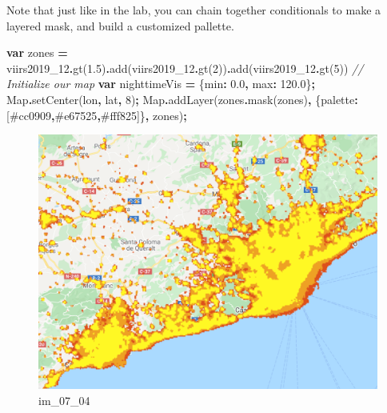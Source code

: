 \documentclass[
]{article}
\newenvironment{Shaded}{\begin{snugshade}}{\end{snugshade}}
\newcommand{\BuiltInTok}[1]{#1}
\newcommand{\CommentTok}[1]{\textcolor[rgb]{0.56,0.35,0.01}{\textit{#1}}}
\newcommand{\DataTypeTok}[1]{\textcolor[rgb]{0.13,0.29,0.53}{#1}}
\newcommand{\DecValTok}[1]{\textcolor[rgb]{0.00,0.00,0.81}{#1}}
\newcommand{\FloatTok}[1]{\textcolor[rgb]{0.00,0.00,0.81}{#1}}
\newcommand{\FunctionTok}[1]{\textcolor[rgb]{0.00,0.00,0.00}{#1}}
\newcommand{\KeywordTok}[1]{\textcolor[rgb]{0.13,0.29,0.53}{\textbf{#1}}}
\newcommand{\NormalTok}[1]{#1}
\newcommand{\OperatorTok}[1]{\textcolor[rgb]{0.81,0.36,0.00}{\textbf{#1}}}
\newcommand{\StringTok}[1]{\textcolor[rgb]{0.31,0.60,0.02}{#1}}
\begin{document}
Note that just like in the lab, you can chain together conditionals to make a layered mask, and build a customized pallette.

\begin{Shaded}
\begin{Highlighting}[]
\KeywordTok{var}\NormalTok{ zones }\OperatorTok{=}\NormalTok{ viirs2019\_12}\OperatorTok{.}\FunctionTok{gt}\NormalTok{(}\FloatTok{1.5}\NormalTok{)}\OperatorTok{.}\FunctionTok{add}\NormalTok{(viirs2019\_12}\OperatorTok{.}\FunctionTok{gt}\NormalTok{(}\DecValTok{2}\NormalTok{))}\OperatorTok{.}\FunctionTok{add}\NormalTok{(viirs2019\_12}\OperatorTok{.}\FunctionTok{gt}\NormalTok{(}\DecValTok{5}\NormalTok{))}
\CommentTok{// Initialize our map}
\KeywordTok{var}\NormalTok{ nighttimeVis }\OperatorTok{=}\NormalTok{ \{}\DataTypeTok{min}\OperatorTok{:} \FloatTok{0.0}\OperatorTok{,} \DataTypeTok{max}\OperatorTok{:} \FloatTok{120.0}\NormalTok{\}}\OperatorTok{;}
\BuiltInTok{Map}\OperatorTok{.}\FunctionTok{setCenter}\NormalTok{(lon}\OperatorTok{,}\NormalTok{ lat}\OperatorTok{,} \DecValTok{8}\NormalTok{)}\OperatorTok{;}
\BuiltInTok{Map}\OperatorTok{.}\FunctionTok{addLayer}\NormalTok{(zones}\OperatorTok{.}\FunctionTok{mask}\NormalTok{(zones)}\OperatorTok{,}\NormalTok{ \{}\StringTok{\textquotesingle{}palette\textquotesingle{}}\OperatorTok{:}\NormalTok{[}\StringTok{\textquotesingle{}\#cc0909\textquotesingle{}}\OperatorTok{,}\StringTok{\textquotesingle{}\#e67525\textquotesingle{}}\OperatorTok{,}\StringTok{\textquotesingle{}\#fff825\textquotesingle{}}\NormalTok{]\}}\OperatorTok{,} \StringTok{\textquotesingle{}zones\textquotesingle{}}\NormalTok{)}\OperatorTok{;}
\end{Highlighting}
\end{Shaded}

\begin{figure}
\centering
\includegraphics{./im/im_07_04.png}
\caption{im\_07\_04}
\end{figure}
\end{document}
